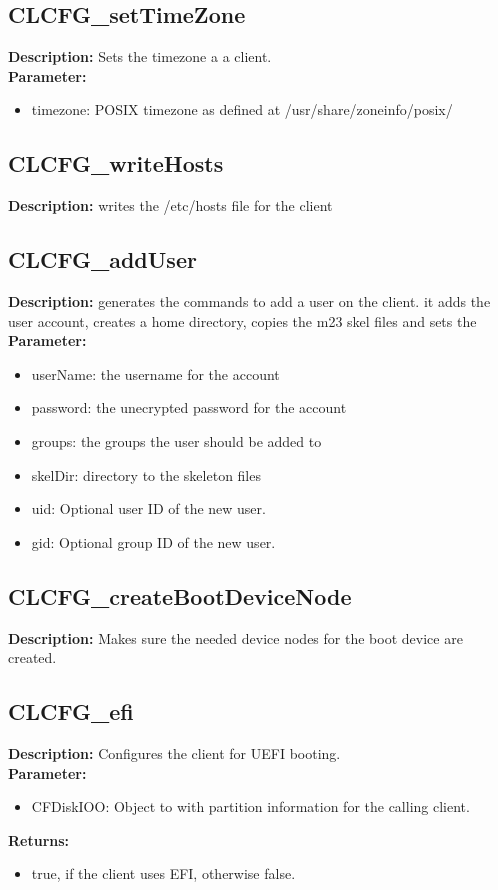 \subsection{CLCFG\_setTimeZone}
\textbf{Description:} Sets the timezone a a client.\\
\textbf{Parameter:}
\begin{itemize}
\item timezone: POSIX timezone as defined at /usr/share/zoneinfo/posix/
\end{itemize}

\subsection{CLCFG\_writeHosts}
\textbf{Description:} writes the /etc/hosts file for the client\\

\subsection{CLCFG\_addUser}
\textbf{Description:} generates the commands to add a user on the client. it adds the user account, creates a home directory, copies the m23 skel files and sets the\\
\textbf{Parameter:}
\begin{itemize}
\item userName: the username for the account
\item password: the unecrypted password for the account
\item groups: the groups the user should be added to
\item skelDir: directory to the skeleton files
\item uid: Optional user ID of the new user.
\item gid: Optional group ID of the new user.
\end{itemize}

\subsection{CLCFG\_createBootDeviceNode}
\textbf{Description:} Makes sure the needed device nodes for the boot device are created.\\

\subsection{CLCFG\_efi}
\textbf{Description:} Configures the client for UEFI booting.\\
\textbf{Parameter:}
\begin{itemize}
\item CFDiskIOO: Object to with partition information for the calling client.
\end{itemize}
\textbf{Returns:}
\begin{itemize}
\item true, if the client uses EFI, otherwise false.
\end{itemize}

